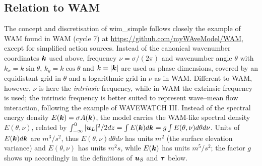 \documentclass[12pt]{article}
\newif\ifdetail
\newcommand{\beq}  { \begin{eqnarray} }
\newcommand{\eeq}  { \end{eqnarray}}
\renewcommand{\v}[1]{{\mbox{\boldmath$ #1 $}}}  %
\newcommand{\p}{{\partial}}
\begin{document}
\subsection*{Relation to WAM}

The concept and discretisation of wim\_simple follows closely the example of WAM
found in WAM (cycle 7) at \url{https://github.com/myWAveModel/WAM},
except for simplified action sources.
Instead of the canonical wavenumber coordinates $\v k$ used above,
frequency $\nu = \sigma/(2 \pi)$ and wavenumber angle $\theta$
with $k_x = k \sin \theta$, $k_y = k \cos \theta$ and $k=|\v k|$ are used as phase dimensions,
covered by an equidistant grid in $\theta$ and a logarithmic grid in $\nu$ as in WAM.
Different to WAM, however, $\nu$ is here the \emph{intrinsic} frequency, while in WAM
the extrinsic frequency is used; the intrinsic frequency is better suited to
represent wave--mean flow interaction, following the example of WAVEWATCH III.
Instead of the spectral energy density $E(\v k) = \sigma A(\v k)$, the model carries
the WAM-like spectral density $E(\theta,\nu)$, related by
$ \int_{-\infty}^0  |\v u_L|^2/2 dz= \int E(\v k) d \v k = g \int E(\theta,\nu) d \theta d\nu  $.
Units of $E(\v k) d \v k$ are $m^3/s^2$,
thus $E(\theta,\nu)  d \theta d\nu$ has units $m^2$ (the surface elevation variance)
and $E(\theta,\nu)$ has units $m^2 s $,
while $E(\v k)$ has units $m^5/s^2$; the factor $g$ shows up accordingly in the
definitions of $\v u_S$ and $\v \tau$ below.
\ifdetail
Coordinate transformation is not necessary but given here for completeness.
 From $(k_x,k_y)$ to ($\theta,k$) 
with $k_x=k \cos \theta$, $k_y=k \sin \theta$
\beq
E(\v k) d \v k  = k E(\v k) d \theta d k
\eeq
since (take absolute value)
\beq
\left |   \begin{array}{cc}
\p k_x /\p \theta & \p k_x/ \p k  \\
\p k_y /\p \theta & \p k_y/ \p k  \\
\end{array} \right|  = 
\left |   \begin{array}{cc}
-k \sin \theta & \cos \theta  \\
k \cos \theta &  \sin \theta\\
\end{array} \right| 
= - k \sin^2 \theta - k \cos^2 \theta = -k
\eeq
 Transformation from  $(\theta,k)$ to  $(\theta,\sigma)$ with $k = \sigma^2/g$ by
\beq
   d \theta d k =  d \theta \frac{\p k}{\p \sigma} d \sigma = 2 (\sigma/g)  d \theta  d \sigma
   ~~,~~
   d \v k =   2 (\sigma^3/g^2)  d \theta  d \sigma
\eeq 
\fi
\end{document}
